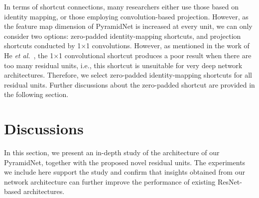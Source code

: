 \documentclass[10pt,twocolumn,letterpaper]{article}
\begin{document}
In terms of shortcut connections, many researchers either use those based on identity mapping, or those employing convolution-based projection. However, as the feature map dimension of PyramidNet is increased at every unit, we can only consider two options: zero-padded identity-mapping shortcuts, and projection shortcuts conducted by 1$\times$1 convolutions. However, as mentioned in the work of He {\it et al.}~\cite{preresnet}, the 1$\times$1 convolutional shortcut produces a poor result when there are too many residual units, i.e., this shortcut is unsuitable for very deep network architectures. Therefore, we select zero-padded identity-mapping shortcuts for all residual units. Further discussions about the zero-padded shortcut are provided in the following section.


\section{Discussions}
\label{sec:discussions}
In this section, we present an in-depth study of the architecture of our PyramidNet, together with the proposed novel residual units. The experiments we include here support the study and confirm that insights obtained from our network architecture can further improve the performance of existing ResNet-based architectures.
\end{document}
